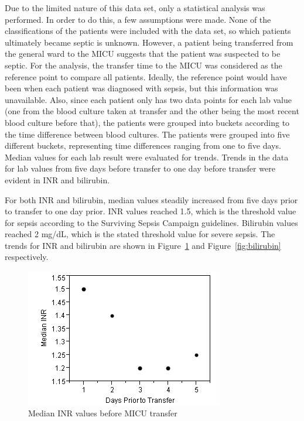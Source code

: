 \documentclass{sig-alternate}
\begin{document}
Due to the limited nature of this data set, only a statistical analysis was performed.  In order to do this, a few assumptions were made.  None of the classifications of the patients were included with the data set, so which patients ultimately became septic is unknown.  However, a patient being transferred from the general ward to the MICU suggests that the patient was suspected to be septic.  For the analysis, the transfer time to the MICU was considered as the reference point to compare all patients.  Ideally, the reference point would have been when each patient was diagnosed with sepsis, but this information was unavailable.  Also, since each patient only has two data points for each lab value (one from the blood culture taken at transfer and the other being the most recent blood culture before that), the patients were grouped into buckets according to the time difference between blood cultures.  The patients were grouped into five different buckets, representing time differences ranging from one to five days.  Median values for each lab result were evaluated for trends.  Trends in the data for lab values from five days before transfer to one day before transfer were evident in INR and bilirubin.

For both INR and bilirubin, median values steadily increased from five days prior to transfer to one day prior.  INR values reached 1.5, which is the threshold value for sepsis according to the Surviving Sepsis Campaign guidelines.  Bilirubin values reached 2 mg/dL, which is the stated threshold value for severe sepsis.  The trends for INR and bilirubin are shown in  Figure~\ref{fig:inr} and  Figure~\ref{fig:bilirubin} respectively.

\begin{figure}
	\begin{center}
		\includegraphics[width=1.0\linewidth]{INRGraph.png}
	\end{center}
	\caption{Median INR values before MICU transfer}
	\label{fig:inr}
\end{figure}
\end{document}
